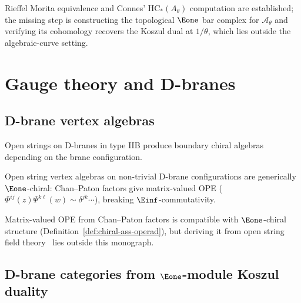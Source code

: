 \begin{remark}[Scope]
Rieffel Morita equivalence and Connes' $\mathrm{HC}_*(A_\theta)$ computation are established; the missing step is constructing the topological $\Eone$ bar complex for $\mathcal{A}_\theta$ and verifying its cohomology recovers the Koszul dual at $1/\theta$, which lies outside the algebraic-curve setting.
\end{remark}


\section{Gauge theory and D-branes}
\subsection{D-brane vertex algebras}

\begin{construction}%
Open strings on D-branes in type IIB produce boundary chiral algebras depending on the brane configuration.
\end{construction}

\begin{conjecture}%
Open string vertex algebras on non-trivial D-brane configurations are generically $\Eone$-chiral: Chan--Paton factors give matrix-valued OPE ($\Phi^{ij}(z)\Psi^{k\ell}(w) \sim \delta^{jk}\cdots$), breaking $\Einf$-commutativity.
\end{conjecture}

\begin{remark}[Scope]
Matrix-valued OPE from Chan--Paton factors is compatible with $\Eone$-chiral structure (Definition~\ref*{def:chiral-ass-operad}), but deriving it from open string field theory~\cite{Zwi93} lies outside this monograph.
\end{remark}


\subsection{\texorpdfstring{D-brane categories from $\Eone$-module Koszul duality}{D-brane categories from E1-module Koszul duality}}

